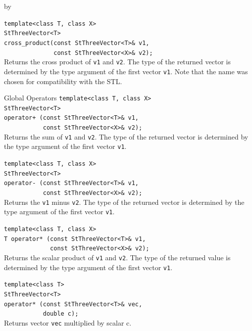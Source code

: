 \documentclass[twoside]{article}
\newcommand{\comp}[1]{\texttt{#1}}%
\newcommand{\entrylabel}[1]{\mbox{\textbf{{#1}}}\hfil}%
\newenvironment{entry}
{\begin{list}{}%
    {\renewcommand{\makelabel}{\entrylabel}%
     \setlength{\labelwidth}{90pt}%
     \setlength{\leftmargin}{\labelwidth}
     \advance\leftmargin by \labelsep%
      }%
    }%
  {\end{list}}
\newcommand{\Entrylabel}[1]%
{\raisebox{0pt}[1ex][0pt]{\makebox[\labelwidth][l]%
    {\parbox[t]{\labelwidth}{\hspace{0pt}\textbf{{#1}}}}}}
\newenvironment{Entry}%
{\renewcommand{\entrylabel}{\Entrylabel}\begin{entry}}%
  {\end{entry}}
\begin{document}
\begin{description}
\begin{Entry}
    \verb+template<class T, class X>+\\
    \verb+StThreeVector<T>+\\
    \verb+cross_product(const StThreeVector<T>& v1,+\\
    \verb+              const StThreeVector<X>& v2);+\\
    Returns the cross product of \comp{v1} and \comp{v2}.
    The type of the returned vector is determined by the type
    argument of the first vector \comp{v1}. Note that the
    name was chosen for compatibility with the STL.
    
\item[Global Operators]
    \verb+template<class T, class X>+\\
    \verb+StThreeVector<T>+\\
    \verb#operator+ (const StThreeVector<T>& v1,#\\
    \verb+           const StThreeVector<X>& v2);+\\
    Returns the sum of \comp{v1} and \comp{v2}.
    The type of the returned vector is determined by the type
    argument of the first vector \comp{v1}.
    
    \verb+template<class T, class X>+\\
    \verb+StThreeVector<T>+\\
    \verb+operator- (const StThreeVector<T>& v1,+\\
    \verb+           const StThreeVector<X>& v2);+\\
    Returns the \comp{v1} minus \comp{v2}.
    The type of the returned vector is determined by the type
    argument of the first vector \comp{v1}.
     
    \verb+template<class T, class X>+\\
    \verb+T operator* (const StThreeVector<T>& v1,+\\
    \verb+             const StThreeVector<X>& v2);+\\
    Returns the scalar product of \comp{v1} and \comp{v2}.
    The type of the returned value is determined by the type
    argument of the first vector \comp{v1}.
    
    \verb+template<class T>+\\
    \verb+StThreeVector<T>+\\
    \verb+operator* (const StThreeVector<T>& vec,+\\
    \verb+           double c);+\\
    Returns vector \comp{vec} multiplied by scalar c.
    

\end{Entry}
\end{description}
\end{document}
